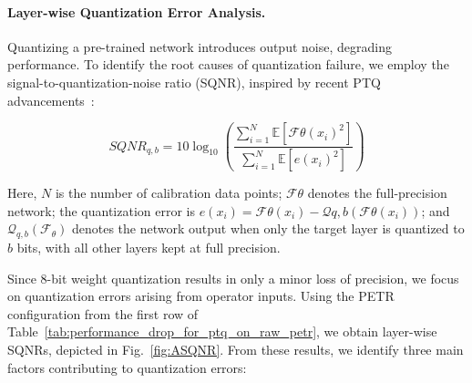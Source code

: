 \paragraph{Layer-wise Quantization Error Analysis.} Quantizing a pre-trained network introduces output noise, degrading performance. To identify the root causes of quantization failure, we employ the signal-to-quantization-noise ratio (SQNR), inspired by recent PTQ advancements~\cite{pandey2023practical, yang2023efficient, pagliari2023plinio}:

\begin{equation}\label{eq:sqnr}
SQNR_{q,b} = 10\log_{10} \left( \frac{ \sum_{i=1}^N \mathbb{E}[{\mathcal{F}}{\theta}(x_{i})^{2} ] }{ \sum_{i=1}^N \mathbb{E}[ e(x_{i})^{2} ] } \right)
\end{equation}

Here, $N$ is the number of calibration data points; $\mathcal{F}{\theta}$ denotes the full-precision network; the quantization error is $e(x_i) = \mathcal{F}{\theta}(x_i) - \mathcal{Q}{q,b}(\mathcal{F}{\theta}(x_i))$; and $\mathcal{Q}_{q,b}(\mathcal{F}_\theta)$ denotes the network output when only the target layer is quantized to $b$ bits, with all other layers kept at full precision.

Since 8-bit weight quantization results in only a minor loss of precision, we focus on quantization errors arising from operator inputs. Using the PETR configuration from the first row of Table~\ref{tab:performance_drop_for_ptq_on_raw_petr}, we obtain layer-wise SQNRs, depicted in Fig.~\ref{fig:ASQNR}. From these results, we identify three main factors contributing to quantization errors:

